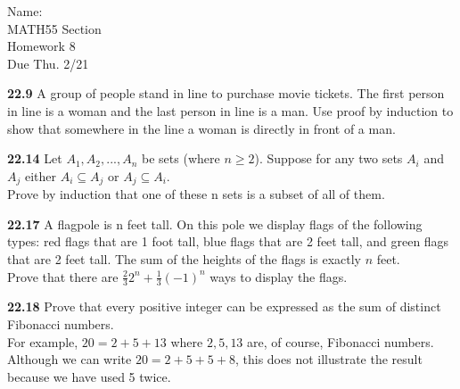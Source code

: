 \documentclass[10pt]{article}
\begin{document}
\begin{flushright}
	Name: \underline{\hspace{3cm}} \\
	MATH55 Section \underline{\hspace{0.5cm}} \\
	Homework 8 \\
	Due Thu. 2/21
\end{flushright}


\begin{framed}
	\textbf{22.9} A group of people stand in line to purchase movie tickets. 
	The first person in line is a woman and the last person in line is a man. 
	Use proof by induction to show that somewhere in the line a woman is 
	directly in front of a man.
\end{framed}

\pagebreak

\begin{framed}
	\textbf{22.14} Let $A_1, A_2, ..., A_n$ be sets (where $n \geq 2$). 
	Suppose for any two sets $A_i$ and $A_j$ either $A_i \subseteq A_j$ or
	$A_j \subseteq A_i$.\\

	Prove by induction that one of these n sets is a subset of all of them.
\end{framed}

\pagebreak

\begin{framed}
	\textbf{22.17} A flagpole is n feet tall. 
	On this pole we display flags of the following types: 
	red flags that are 1 foot tall, blue flags that are 2 feet tall, 
	and green flags that are 2 feet tall. The sum of the heights of the flags 
	is exactly $n$ feet.\\

	Prove that there are $\frac{2}{3}2^n+\frac{1}{3}(-1)^n$ ways to display the flags.
\end{framed}

\pagebreak

\begin{framed}
	\textbf{22.18} Prove that every positive integer can be expressed as the sum 
	of distinct Fibonacci numbers.\\

	For example, $20 = 2 + 5 + 13$ where $2, 5, 13$ are, of course, Fibonacci numbers. 
	Although we can write $20 = 2 + 5 + 5 + 8$, this does not illustrate the result 
	because we have used 5 twice.
\end{framed}
\end{document}
